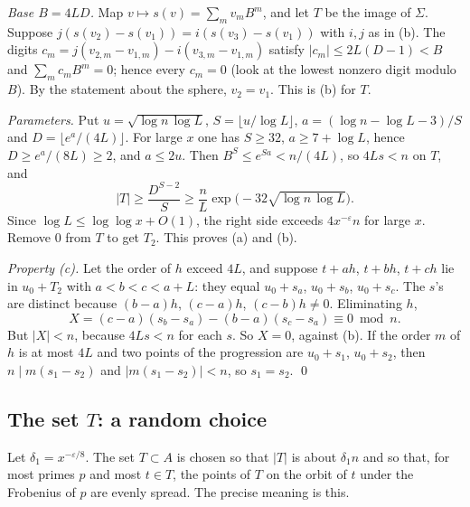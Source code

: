 \documentclass[11pt,letterpaper]{article}
\begin{document}
\emph{Base $B=4LD$.} Map $v\mapsto s(v)=\sum_mv_mB^m$, and let $T$ be the image of $\Sigma$. Suppose
$j(s(v_2)-s(v_1))=i(s(v_3)-s(v_1))$ with $i,j$ as in (b). The digits
$c_m=j(v_{2,m}-v_{1,m})-i(v_{3,m}-v_{1,m})$ satisfy $|c_m|\le2L(D-1)<B$ and $\sum_mc_mB^m=0$; hence every
$c_m=0$ (look at the lowest nonzero digit modulo $B$). By the statement about the sphere, $v_2=v_1$. This
is (b) for $T$.

\emph{Parameters.} Put $u=\sqrt{\log n\,\log L}$, $S=\lfloor u/\log L\rfloor$, $a=(\log n-\log L-3)/S$ and
$D=\lfloor e^a/(4L)\rfloor$. For large $x$ one has $S\ge32$, $a\ge7+\log L$, hence $D\ge e^a/(8L)\ge2$, and $a\le2u$.
Then $B^S\le e^{Sa}<n/(4L)$, so $4Ls<n$ on $T$, and
\begin{equation}\label{D:140}
 |T|\ge\frac{D^{S-2}}S\ge\frac nL\exp\big(-32\sqrt{\log n\,\log L}\big).
\end{equation}
Since $\log L\le\log\log x+O(1)$, the right side exceeds $4x^{-\varepsilon}n$ for large $x$. Remove $0$ from
$T$ to get $T_2$. This proves (a) and (b).

\emph{Property (c).} Let the order of $h$ exceed $4L$, and suppose $t+ah$, $t+bh$, $t+ch$ lie in $u_0+T_2$
with $a<b<c<a+L$: they equal $u_0+s_a$, $u_0+s_b$, $u_0+s_c$. The $s$'s are distinct because $(b-a)h$,
$(c-a)h$, $(c-b)h\ne0$. Eliminating $h$,
\begin{equation}\label{D:141}
 X=(c-a)(s_b-s_a)-(b-a)(s_c-s_a)\equiv0\bmod n .
\end{equation}
But $|X|<n$, because $4Ls<n$ for each $s$. So $X=0$, against (b). If the order $m$ of $h$ is at most $4L$
and two points of the progression are $u_0+s_1$, $u_0+s_2$, then $n\mid m(s_1-s_2)$ and $|m(s_1-s_2)|<n$, so
$s_1=s_2$. \qed

\subsection*{The set $T$: a random choice}

Let $\delta_1=x^{-\varepsilon/8}$. The set $T\subset A$ is chosen so that $|T|$ is about $\delta_1n$ and so that,
for most primes $p$ and most $t\in T$, the points of $T$ on the orbit of $t$ under the Frobenius of $p$ are
evenly spread. The precise meaning is this.
\end{document}
